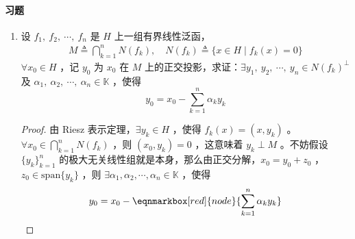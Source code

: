 	\paragraph{习题}
	\begin{enumerate}[leftmargin=2cm, label=\arabic*]
		\item 设 $f_1,\ f_2,\ \cdots,\ f_n$ 是 $H$ 上一组有界线性泛函，
		\begin{align*}
			M \triangleq \bigcap\limits_{k=1}^n N(f_k), \quad N(f_k) \triangleq \{x\in H\mid f_k(x) = 0\}
		\end{align*}
		$\forall x_0\in H$ ，记 $y_0$ 为 $x_0$ 在 $M$ 上的正交投影，求证：$\exists y_1,\ y_2,\ \cdots,\ y_n\in N(f_k)^{\perp}$ 及 $\alpha_1,\ \alpha_2,\ \cdots,\ \alpha_n\in\mathbb{K}$ ，使得
		\begin{equation*}
			y_0 = x_0 - \sum\limits_{k=1}^n \alpha_ky_k
		\end{equation*}
		\begin{proof}
			由 Riesz 表示定理，$\exists y_k\in H$ ，使得 $f_k(x) = (x,y_k)$ 。$\forall x_0\in \bigcap\limits_{k=1}^n N(f_k)$ ，则 $(x_0, y_k) = 0$ ，这意味着 $y_k\perp M$ 。不妨假设 $\{y_k\}_{k=1}^{n}$ 的极大无关线性组就是本身，那么由正交分解，$x_0 = y_0 + z_0$ ，$z_0\in \text{span}\{y_k\}$ ，则 $\exists \alpha_1, \alpha_2,\cdots, \alpha_n\in\mathbb{K}$ ，使得
			\begin{equation*}
				y_0 = x_0 - \eqnmarkbox[red]{node}{\sum\limits_{k=1}^n \alpha_k y_k}
			\end{equation*}
			

\end{proof}
\end{enumerate}

